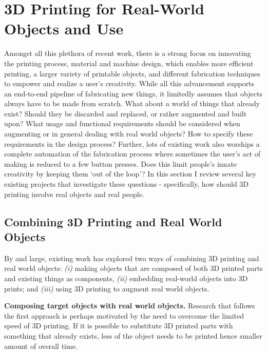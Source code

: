 \section{3D Printing for Real-World Objects and Use}
Amongst all this plethora of recent work, there is a strong focus on innovating the printing process, material and machine design, which enables more efficient printing, a larger variety of printable objects, and different fabrication techniques to empower and realize a user's creativity. While all this advancement supports an end-to-end pipeline of fabricating new things, it limitedly assumes that objects always have to be made from scratch. What about a world of things that already exist? Should they be discarded and replaced, or rather augmented and built upon? What usage and functional requirements should be considered when augmenting or in general dealing with real world objects? How to specify these requirements in the design process? Further, lots of existing work also worships a complete automation of the fabrication process where sometimes the user's act of making is reduced to a few button presses. Does this limit people's innate creativity by keeping them `out of the loop'? In this section I review several key existing projects that investigate these questions - specifically, how should 3D printing involve real objects and real people.


\subsection{Combining 3D Printing and Real World Objects}
By and large, existing work has explored two ways of combining 3D printing and real world objects: {\em (i)} making objects that are composed of both 3D printed parts and existing things as components, {\em (ii)} embedding real-world objects into 3D prints; and {\em (iii)} using 3D printing to augment real world objects.

\textbf{Composing target objects with real world objects.} Research that follows the first approach is perhaps motivated by the need to overcome the limited speed of 3D printing. If it is possible to substitute 3D printed parts with something that already exists, less of the object needs to be printed hence smaller amount of overall time. 

